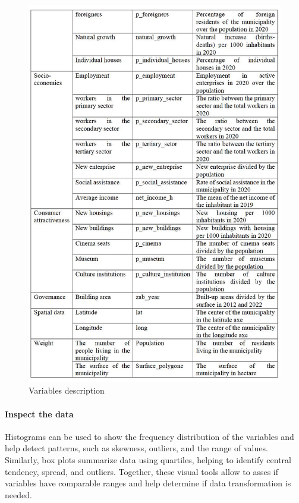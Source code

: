 \documentclass[
]{article}
\begin{document}
\begin{figure}

{\centering \includegraphics[width=1\linewidth,height=1\textheight]{images/Variables2} 

}

\caption{Variables description \label{Variables}}\label{fig:variables-2}
\end{figure}

\paragraph{Inspect the data}\label{inspect-the-data}

Histograms can be used to show the frequency distribution of the variables and help detect patterns, such as skewness, outliers, and the range of values. Similarly, box plots summarize data using quartiles, helping to identify central tendency, spread, and outliers. Together, these visual tools allow to asses if variables have comparable ranges and help determine if data transformation is needed.
\end{document}
